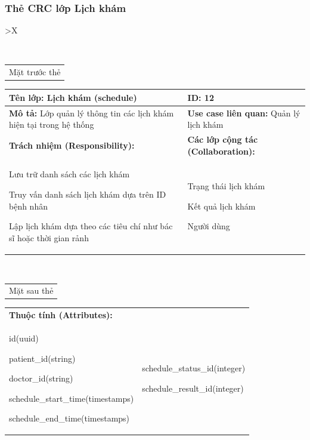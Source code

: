 \subsubsection{Thẻ CRC lớp Lịch khám}

\begin{xltabular}{\textwidth}{
		>{\centering\arraybackslash}X
	}
	\caption{\bfseries \fontsize{12pt}{0pt}\selectfont Thẻ CRC lớp Lịch khám}
	\\
	\begin{tabularx}{0.9\textwidth}{X}
		Mặt trước thẻ
	\end{tabularx}
	\begin{tabularx}{0.9\textwidth}{|X|X|}
		\hline
		\textbf{Tên lớp:} Lịch khám (schedule)                                      & \textbf{ID:} 12                                 \\
		\hline
		\textbf{Mô tả:} Lớp quản lý thông tin các lịch khám hiện tại trong hệ thống & \textbf{Use case liên quan:}  Quản lý lịch khám \\
		\hline
		\textbf{Trách nhiệm (Responsibility):}                                      & \textbf{Các lớp cộng tác (Collaboration):}      \\
		Lưu trữ danh sách các lịch khám

		Truy vấn danh sách lịch khám dựa trên ID bệnh nhân

		Lập lịch khám dựa theo các tiêu chí như bác sĩ hoặc thời gian rảnh
		                                                                            &
		Trạng thái lịch khám

		Kết quả lịch khám

		Người dùng
		\\
		\hline
	\end{tabularx}
	\\
	\begin{tabularx}{0.9\textwidth}{X}
		Mặt sau thẻ
	\end{tabularx}
	\begin{tabularx}{0.9\textwidth}{|X|X|}
		\hline
		\textbf{Thuộc tính (Attributes):} & \\
		id(uuid)

		patient\_id(string)

		doctor\_id(string)

		schedule\_start\_time(timestamps)

		schedule\_end\_time(timestamps)
		                                  &
		schedule\_status\_id(integer)

		schedule\_result\_id(integer)


\end{tabularx}
\end{xltabular}
